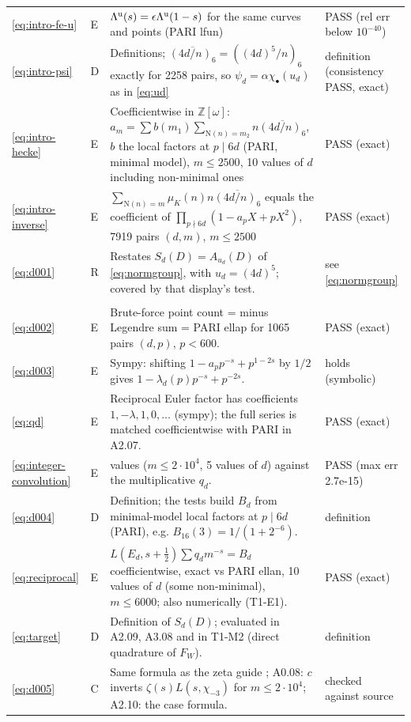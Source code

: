 \documentclass[11pt]{article}
\numberwithin{equation}{section}
\newcommand{\N}{\mathrm N}
\newcommand{\muk}{\mu_K}
\begin{document}
\begin{longtable}{@{}>{\raggedright\arraybackslash}p{1.2cm}>{\centering\arraybackslash}p{0.7cm}>{\raggedright\arraybackslash}p{9.05cm}>{\raggedright\arraybackslash}p{4.3cm}@{}}
\eqref{eq:intro-fe-u} & E & $\Lambda^{\rm u}(s)=\epsilon\Lambda^{\rm u}(1-s)$ for the same curves and points (PARI lfun) & PASS (rel err below $10^{-40}$)\\
\eqref{eq:intro-psi} & D & Definitions; $\overline{(4d/n)_6}=((4d)^5/n)_6$ exactly for 2258 pairs, so $\psi_d=\alpha\chi_\bullet(u_d)$ as in \eqref{eq:ud} & definition (consistency PASS, exact)\\
\eqref{eq:intro-hecke} & E & Coefficientwise in $\mathbb Z[\omega]$: $a_m=\sum b(m_1)\sum_{\N(n)=m_2}n\overline{(4d/n)_6}$, $b$ the local factors at $p\mid6d$ (PARI, minimal model), $m\le2500$, 10 values of $d$ including non-minimal ones & PASS (exact)\\
\eqref{eq:intro-inverse} & E & $\sum_{\N(n)=m}\muk(n)n\overline{(4d/n)_6}$ equals the coefficient of $\prod_{p\nmid6d}(1-a_pX+pX^2)$, 7919 pairs $(d,m)$, $m\le2500$ & PASS (exact)\\
\eqref{eq:d001} & R & Restates $S_d(D)=A_{u_d}(D)$ of \eqref{eq:normgroup}, with $u_d=(4d)^5$; covered by that display's test. & see \eqref{eq:normgroup}\\
\multicolumn{4}{@{}l}{\emph{Section~2}}\\
\eqref{eq:d002} & E & Brute-force point count = minus Legendre sum = PARI ellap for 1065 pairs $(d,p)$, $p<600$. & PASS (exact)\\
\eqref{eq:d003} & E & Sympy: shifting $1-a_pp^{-s}+p^{1-2s}$ by $1/2$ gives $1-\lambda_d(p)p^{-s}+p^{-2s}$. & holds (symbolic)\\
\eqref{eq:qd} & E & Reciprocal Euler factor has coefficients $1,-\lambda,1,0,\dots$ (sympy); the full series is matched coefficientwise with PARI in A2.07. & PASS (exact)\\
\eqref{eq:integer-convolution} & E & 32382 values ($m\le2\cdot10^4$, 5 values of $d$) against the multiplicative $q_d$. & PASS (max err 2.7e-15)\\
\eqref{eq:d004} & D & Definition; the tests build $B_d$ from minimal-model local factors at $p\mid6d$ (PARI), e.g. $B_{16}(3)=1/(1+2^{-6})$. & definition\\
\eqref{eq:reciprocal} & E & $L(E_d,s+\frac12)\sum q_dm^{-s}=B_d$ coefficientwise, exact vs PARI ellan, 10 values of $d$ (some non-minimal), $m\le6000$; also numerically (T1-E1). & PASS (exact)\\
\eqref{eq:target} & D & Definition of $S_d(D)$; evaluated in A2.09, A3.08 and in T1-M2 (direct quadrature of $F_W$). & definition\\
\eqref{eq:d005} & C & Same formula as the zeta guide \cite[(1.2)]{ZG}; A0.08: $c$ inverts $\zeta(s)L(s,\chi_{-3})$ for $m\le2\cdot10^4$; A2.10: the case formula. & checked against source\\

\end{longtable}
\end{document}

